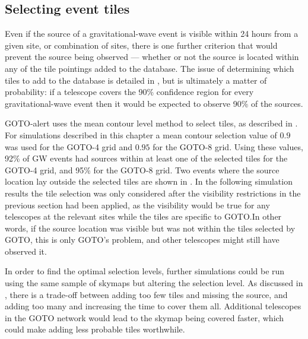 
\subsection{Selecting event tiles}
\label{sec:gw_selecting}
\begin{colsection}

Even if the source of a gravitational-wave event is visible within 24 hours from a given site, or combination of sites, there is one further criterion that would prevent the source being observed --- whether or not the source is located within any of the tile pointings added to the database. The issue of determining which tiles to add to the database is detailed in , but is ultimately a matter of probability: if a telescope covers the 90\% confidence region for every gravitational-wave event then it would be expected to observe 90\% of the sources.

GOTO-alert uses the mean contour level method to select tiles, as described in . For simulations described in this chapter a mean contour selection value of $0.9$ was used for the GOTO-4 grid and $0.95$ for the GOTO-8 grid. Using these values, 92\% of GW events had sources within at least one of the selected tiles for the GOTO-4 grid, and 95\% for the GOTO-8 grid. Two events where the source location lay outside the selected tiles are shown in . In the following simulation results the tile selection was only considered after the visibility restrictions in the previous section had been applied, as the visibility would be true for any telescopes at the relevant sites while the tiles are specific to GOTO.\@ In other words, if the source location was visible but was not within the tiles selected by GOTO, this is only GOTO's problem, and other telescopes might still have observed it.

In order to find the optimal selection levels, further simulations could be run using the same sample of skymaps but altering the selection level. As discussed in , there is a trade-off between adding too few tiles and missing the source, and adding too many and increasing the time to cover them all. Additional telescopes in the GOTO network would lead to the skymap being covered faster, which could make adding less probable tiles worthwhile.


\end{colsection}
